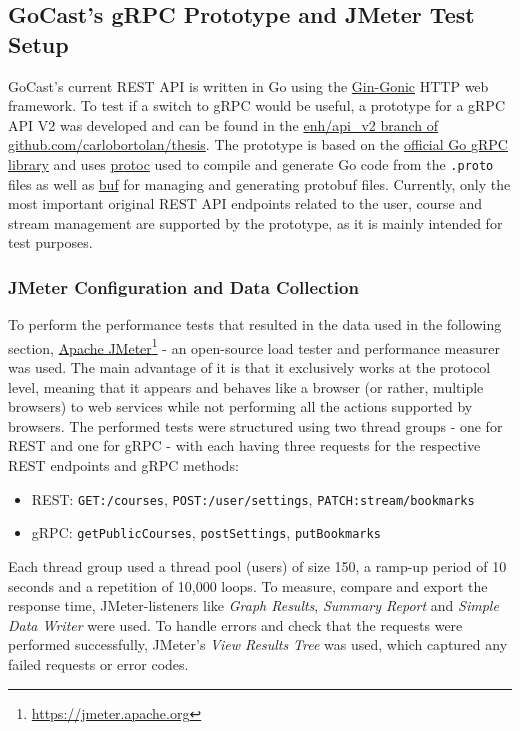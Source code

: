 \subsection{GoCast's gRPC Prototype and JMeter Test Setup}

GoCast's current \ac{REST} \ac{API} is written in Go using the \href{https://github.com/gin-gonic/gin}{Gin-Gonic} HTTP web framework. To test if a switch to \ac{gRPC} would be useful, a prototype for a \ac{gRPC} \ac{API} V2 was developed and can be found in the \href{https://github.com/carlobortolan/thesis/tree/enh/api\_v2}{enh/api\_v2 branch of github.com/carlobortolan/thesis}.
The prototype is based on the \href{https://google.golang.org/gprc}{official Go \ac{gRPC} library} and uses \href{https://github.com/protocolbuffers/protobuf}{protoc} used to compile and generate Go code from the \texttt{.proto} files as well as \href{https://github.com/bufbuild/buf}{buf} for managing and generating protobuf files. Currently, only the most important original \ac{REST} \ac{API} endpoints related to the user, course and stream management are supported by the prototype, as it is mainly intended for test purposes.

\subsubsection{JMeter Configuration and Data Collection}

To perform the performance tests that resulted in the data used in the following section, \href{https://jmeter.apache.org}{Apache JMeter}\footnote{\url{https://jmeter.apache.org}} - an open-source load tester and performance measurer was used. The main advantage of it is that it exclusively works at the protocol level, meaning that it appears and behaves like a browser (or rather, multiple browsers) to web services while not performing all the actions supported by browsers. The performed tests were structured using two thread groups - one for \ac{REST} and one for \ac{gRPC} - with each having three requests for the respective \ac{REST} endpoints and \ac{gRPC} methods:
\begin{itemize}
    \item \ac{REST}: \texttt{GET:/courses}, \texttt{POST:/user/settings}, \texttt{PATCH:stream/bookmarks}
    \item \ac{gRPC}: \texttt{getPublicCourses}, \texttt{postSettings}, \texttt{putBookmarks}
\end{itemize}
\break
Each thread group used a thread pool (users) of size 150, a ramp-up period of 10 seconds and a repetition of 10,000 loops.
To measure, compare and export the response time, JMeter-listeners like \textit{Graph Results}, \textit{Summary Report} and \textit{Simple Data Writer} were used. To handle errors and check that the requests were performed successfully, JMeter’s \textit{View Results Tree} was used, which captured any failed requests or error codes.

